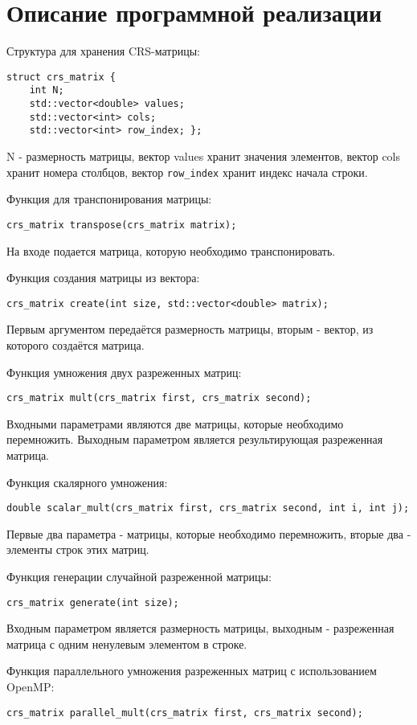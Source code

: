 \documentclass{report}
\begin{document}
\section* {Описание программной реализации}
Структура для хранения CRS-матрицы:
\begin{lstlisting}
struct crs_matrix {
    int N;
    std::vector<double> values;
    std::vector<int> cols;
    std::vector<int> row_index; };
\end{lstlisting}
N - размерность матрицы, вектор values хранит значения элементов, вектор cols хранит номера столбцов, вектор \verb|row_index| хранит индекс начала строки.
\par Функция для транспонирования матрицы:
\begin{lstlisting}
crs_matrix transpose(crs_matrix matrix);
\end{lstlisting}
На входе подается матрица, которую необходимо транспонировать.
\par Функция создания матрицы из вектора:
\begin{lstlisting}
crs_matrix create(int size, std::vector<double> matrix);
\end{lstlisting}
Первым аргументом передаётся размерность матрицы, вторым - вектор, из которого создаётся матрица. 
\par Функция умножения двух разреженных матриц:
\begin{lstlisting}
crs_matrix mult(crs_matrix first, crs_matrix second);
\end{lstlisting}
Входными параметрами являются две матрицы, которые необходимо перемножить. Выходным параметром является результирующая разреженная матрица.
\par Функция скалярного умножения:
\begin{lstlisting}
double scalar_mult(crs_matrix first, crs_matrix second, int i, int j);
\end{lstlisting}
Первые два параметра - матрицы, которые необходимо перемножить, вторые два - элементы строк этих матриц.
\par Функция генерации случайной разреженной матрицы:
\begin{lstlisting}
crs_matrix generate(int size);
\end{lstlisting}
Входным параметром является размерность матрицы, выходным - разреженная матрица с одним ненулевым элементом в строке.
\par Функция параллельного умножения разреженных матриц с использованием OpenMP:
\begin{lstlisting}
crs_matrix parallel_mult(crs_matrix first, crs_matrix second);
\end{lstlisting}
\end{document}
